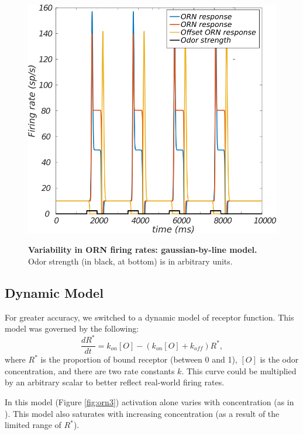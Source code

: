 \documentclass[a4paper,12pt,twoside]{article}
\begin{document}
\begin{figure}
\centering
\caption{\textbf{Variability in ORN firing rates: gaussian-by-line model.}  Odor strength (in black, at bottom) is in arbitrary units. \newline}
\hspace*{1.25cm}
\includegraphics[scale=1.2]{2016-08-05_gauss_line_linear_model.png}
\label{fig:orn2}
\end{figure}

\subsection{Dynamic Model}
For greater accuracy, we switched to a dynamic model of receptor function.  This model was governed by the following:
\begin{equation}
\frac{dR^*}{dt} = k_{on}[O] - (k_{on}[O] + k_{off})R^*,
\end{equation}
where $R^*$ is the proportion of bound receptor (between 0 and 1), $[O]$ is the odor concentration, and there are two rate constants $k.$  This curve could be multiplied by an arbitrary scalar to better reflect real-world firing rates.

In this model (Figure \ref{fig:orn3}) activation alone varies with concentration (as in \cite{Nagel2011}).  This model also saturates with increasing concentration (as a result of the limited range of $R^*$).
\end{document}
